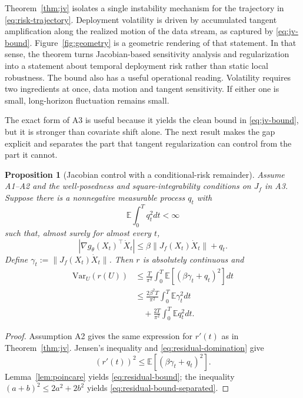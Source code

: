 \documentclass[conference]{IEEEtran}
\newtheorem{proposition}{Proposition}
\newcommand{\E}{\mathbb{E}}
\newcommand{\Var}{\mathrm{Var}}
\begin{document}
Theorem~\ref{thm:jv} isolates a single instability mechanism for the trajectory in \eqref{eq:risk-trajectory}. Deployment volatility is driven by accumulated tangent amplification along the realized motion of the data stream, as captured by \eqref{eq:jv-bound}. Figure~\ref{fig:geometry} is a geometric rendering of that statement. In that sense, the theorem turns Jacobian-based sensitivity analysis and regularization \cite{sokolic-jacobian,novak-sensitivity,kim-jacobian} into a statement about temporal deployment risk rather than static local robustness. The bound also has a useful operational reading. Volatility requires two ingredients at once, data motion and tangent sensitivity. If either one is small, long-horizon fluctuation remains small.

The exact form of A3 is useful because it yields the clean bound in \eqref{eq:jv-bound}, but it is stronger than covariate shift alone. The next result makes the gap explicit and separates the part that tangent regularization can control from the part it cannot.

\begin{proposition}[Jacobian control with a conditional-risk remainder]
\label{prop:residual}
Assume A1--A2 and the well-posedness and square-integrability conditions on $J_f$ in A3. Suppose there is a nonnegative measurable process $q_t$ with
\[
\E\int_0^T q_t^2dt<\infty
\]
such that, almost surely for almost every $t$,
\begin{equation}
\label{eq:residual-domination}
|\nabla g_\theta(X_t)^\top\dot X_t|
\le
\beta\|J_f(X_t)\dot X_t\|+q_t.
\end{equation}
Define $\gamma_t:=\|J_f(X_t)\dot X_t\|$. Then $r$ is absolutely continuous and
\begin{align}
\Var_U(r(U))
&\le
\frac{T}{\pi^2}\int_0^T
\E[(\beta\gamma_t+q_t)^2]dt
\label{eq:residual-bound}\\
&\le
\frac{2\beta^2T}{\pi^2}\int_0^T\E\gamma_t^2dt
\nonumber\\
&\quad+
\frac{2T}{\pi^2}\int_0^T\E q_t^2dt.
\label{eq:residual-bound-separated}
\end{align}
\end{proposition}

\begin{proof}
Assumption A2 gives the same expression for $r'(t)$ as in Theorem~\ref{thm:jv}. Jensen's inequality and \eqref{eq:residual-domination} give
\[
(r'(t))^2
\le
\E[(\beta\gamma_t+q_t)^2].
\]
Lemma~\ref{lem:poincare} yields \eqref{eq:residual-bound}; the inequality $(a+b)^2\le 2a^2+2b^2$ yields \eqref{eq:residual-bound-separated}.
\end{proof}
\end{document}
